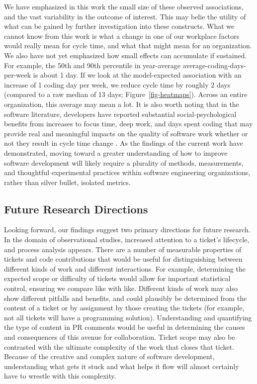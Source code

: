 \documentclass[manuscript,screen,review]{acmart}
\begin{document}
We have emphasized in this work the small size of these observed
associations, and the vast variability in the outcome of interest. This
may belie the utility of what can be gained by further investigation
into these constructs. What we cannot know from this work is what a
change in one of our workplace factors would really mean for cycle time,
and what that might mean for an organization. We also have not yet
emphasized how small effects can accumulate if sustained. For example,
the 50th and 90th percentile in year-average
average-coding-days-per-week is about 1 day. If we look at the
model-expected association with an increase of 1 coding day per week, we
reduce cycle time by roughly 2 days (compared to a raw median of 13
days; Figure~\ref{fig-heatmaps}). Across an entire organization, this
average may mean a lot. It is also worth noting that in the software
literature, developers have reported substantial social-psychological
benefits from increases to focus time, deep work, and days spent coding
that may provide real and meaningful impacts on the quality of software
work whether or not they result in cycle time change
\citep{meyerTodayWasGood2021}. As the findings of the current work have
demonstrated, moving toward a greater understanding of how to improve
software development will likely require a plurality of methods,
measurements, and thoughtful experimental practices within software
engineering organizations, rather than silver bullet, isolated metrics.

\subsection{Future Research
Directions}\label{future-research-directions}

Looking forward, our findings suggest two primary directions for future
research. In the domain of observational studies, increased attention to
a ticket's lifecycle, and process analysis appears. There are a number
of measurable properties of tickets and code contributions that would be
useful for distinguishing between different kinds of work and different
interactions. For example, determining the expected scope or difficulty
of tickets would allow for important statistical control, ensuring we
compare like with like. Different kinds of work may also show different
pitfalls and benefits, and could plausibly be determined from the
content of a ticket or by assignment by those creating the tickets (for
example, not all tickets will have a programming solution).
Understanding and quantifying the type of content in PR comments would
be useful in determining the causes and consequences of this avenue for
collaboration. Ticket scope may also be contrasted with the ultimate
complexity of the work that closes that ticket. Because of the creative
and complex nature of software development, understanding what gets it
stuck and what helps it flow will almost certainly have to wrestle with
this complexity.




\end{document}
